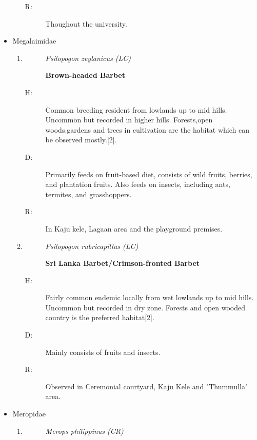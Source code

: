 \begin{itemize}
\begin{enumerate}
\begin{description}
\item[R: ]%
Thoughout the university.%
\end{description}%
\end{enumerate}%
\item%
Megalaimidae%
\begin{enumerate}%
\item%
\begin{description}%
\item[]%
\textit{Psilopogon zeylanicus (LC)}%
\item[]%
\textbf{Brown{-}headed Barbet}%
\end{description}%
\begin{description}%
\item[H: ]%
Common breeding resident from lowlands up to mid hills. Uncommon but recorded in higher hills. Forests,open woods.gardens and trees in cultivation are the habitat which can be observed mostly.{[}2{]}.%
\item[D: ]%
Primarily feeds on fruit{-}based diet, consists of wild fruits, berries, and plantation fruits. Also feeds on insects, including ants, termites, and grasshoppers.%
\item[R: ]%
In Kaju kele, Lagaan area and the playground premises.%
\end{description}%
\item%
\begin{description}%
\item[]%
\textit{Psilopogon rubricapillus (LC)}%
\item[]%
\textbf{Sri Lanka Barbet/Crimson{-}fronted Barbet}%
\end{description}%
\begin{description}%
\item[H: ]%
Fairly common endemic locally from wet lowlands up to mid hills. Uncommon but recorded in dry zone. Forests and open wooded country is the preferred habitat{[}2{]}.%
\item[D: ]%
Mainly consists of fruits and insects.%
\item[R: ]%
Observed in Ceremonial courtyard, Kaju Kele and "Thummulla" area.%
\end{description}%
\end{enumerate}%
\item%
Meropidae%
\begin{enumerate}%
\item%
\begin{description}%
\item[]%
\textit{Merops philippinus (CR)}%

\end{description}
\end{enumerate}
\end{itemize}
